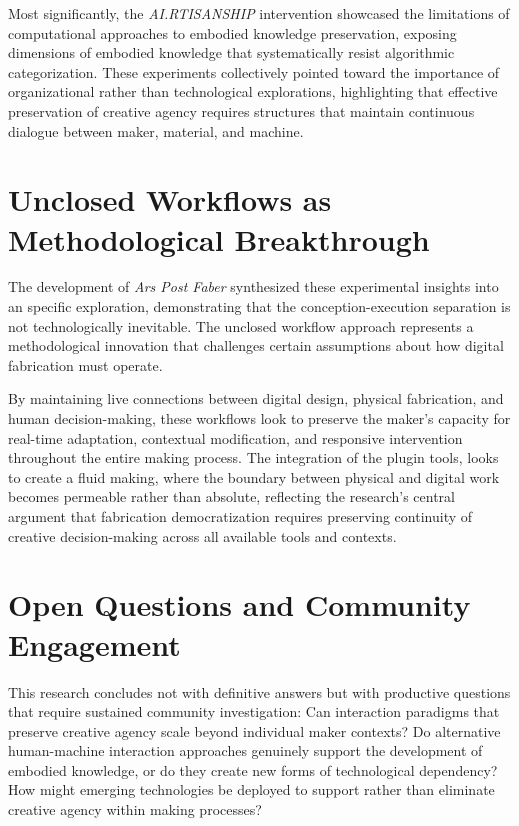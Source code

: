 Most significantly, the \textit{AI.RTISANSHIP} intervention showcased the limitations of computational approaches to embodied knowledge preservation, exposing dimensions of embodied knowledge that systematically resist algorithmic categorization. These experiments collectively pointed toward the importance of organizational rather than technological explorations, highlighting that effective preservation of creative agency requires structures that maintain continuous dialogue between maker, material, and machine.

\section{Unclosed Workflows as Methodological Breakthrough}

The development of \textit{Ars Post Faber} synthesized these experimental insights into an specific exploration, demonstrating that the conception-execution separation is not technologically inevitable. The unclosed workflow approach represents a methodological innovation that challenges certain assumptions about how digital fabrication must operate.

\vspace{0.5cm}

By maintaining live connections between digital design, physical fabrication, and human decision-making, these workflows look to preserve the maker's capacity for real-time adaptation, contextual modification, and responsive intervention throughout the entire making process. The integration of the plugin tools, looks to create a fluid making, where the boundary between physical and digital work becomes permeable rather than absolute, reflecting the research's central argument that fabrication democratization requires preserving continuity of creative decision-making across all available tools and contexts.

\section{Open Questions and Community Engagement}

This research concludes not with definitive answers but with productive questions that require sustained community investigation: Can interaction paradigms that preserve creative agency scale beyond individual maker contexts? Do alternative human-machine interaction approaches genuinely support the development of embodied knowledge, or do they create new forms of technological dependency? How might emerging technologies be deployed to support rather than eliminate creative agency within making processes?

